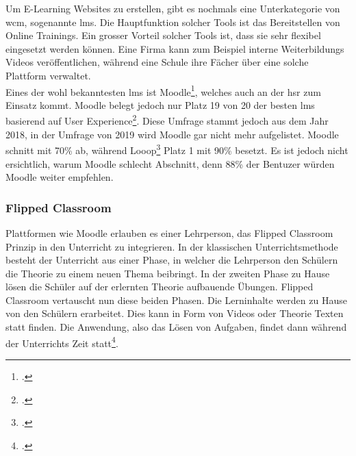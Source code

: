 Um E-Learning Websites zu erstellen, gibt es nochmals eine Unterkategorie von \gls{wcm}, sogenannte \gls{lms}. Die Hauptfunktion solcher Tools ist das Bereitstellen von Online Trainings. Ein grosser Vorteil solcher Tools ist, dass sie sehr flexibel eingesetzt werden können. Eine Firma kann zum Beispiel interne Weiterbildungs Videos veröffentlichen, während eine Schule ihre Fächer über eine solche Plattform verwaltet. \\

Eines der wohl bekanntesten \gls{lms} ist Moodle\footcite{moodle_homepage}, welches auch an der \gls{hsr} zum Einsatz kommt. Moodle belegt jedoch nur Platz 19 von 20 der besten \gls{lms} basierend auf User Experience\footcite{moodle_ux}. Diese Umfrage stammt jedoch aus dem Jahr 2018, in der Umfrage von 2019 wird Moodle gar nicht mehr aufgelistet. Moodle schnitt mit 70\% ab, während Looop\footcite{looop_homepage} Platz 1 mit 90\% besetzt. Es ist jedoch nicht ersichtlich, warum Moodle schlecht Abschnitt, denn 88\% der Bentuzer würden Moodle weiter empfehlen.


%
%
%

\subsubsection{Flipped Classroom}
Plattformen wie Moodle erlauben es einer Lehrperson, das Flipped Classroom Prinzip in den Unterricht zu integrieren. In der klassischen Unterrichtsmethode besteht der Unterricht aus einer Phase, in welcher die Lehrperson den Schülern die Theorie zu einem neuen Thema beibringt. In der zweiten Phase zu Hause lösen die Schüler auf der erlernten Theorie aufbauende Übungen. Flipped Classroom vertauscht nun diese beiden Phasen. Die Lerninhalte werden zu Hause von den Schülern erarbeitet. Dies kann in Form von Videos oder Theorie Texten statt finden. Die Anwendung, also das Lösen von Aufgaben, findet dann während der Unterrichts Zeit statt\footcite{flipped_classroom_theorie}. \\

